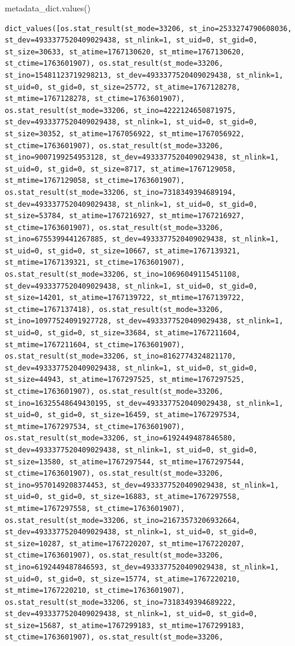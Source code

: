 \documentclass[
  spanish,
  letterpaper,
]{scrbook}
\newenvironment{Shaded}{\begin{snugshade}}{\end{snugshade}}
\newcommand{\NormalTok}[1]{\textcolor[rgb]{0.00,0.23,0.31}{#1}}
\theoremstyle{definition}
\theoremstyle{remark}
\begin{document}
\begin{Shaded}
\begin{Highlighting}[]
\NormalTok{metadata\_dict.values()}
\end{Highlighting}
\end{Shaded}

\begin{verbatim}
dict_values([os.stat_result(st_mode=33206, st_ino=2533274790608036, st_dev=4933377520409029438, st_nlink=1, st_uid=0, st_gid=0, st_size=30633, st_atime=1767130620, st_mtime=1767130620, st_ctime=1763601907), os.stat_result(st_mode=33206, st_ino=15481123719298213, st_dev=4933377520409029438, st_nlink=1, st_uid=0, st_gid=0, st_size=25772, st_atime=1767128278, st_mtime=1767128278, st_ctime=1763601907), os.stat_result(st_mode=33206, st_ino=4222124650871975, st_dev=4933377520409029438, st_nlink=1, st_uid=0, st_gid=0, st_size=30352, st_atime=1767056922, st_mtime=1767056922, st_ctime=1763601907), os.stat_result(st_mode=33206, st_ino=9007199254953128, st_dev=4933377520409029438, st_nlink=1, st_uid=0, st_gid=0, st_size=8717, st_atime=1767129058, st_mtime=1767129058, st_ctime=1763601907), os.stat_result(st_mode=33206, st_ino=7318349394689194, st_dev=4933377520409029438, st_nlink=1, st_uid=0, st_gid=0, st_size=53784, st_atime=1767216927, st_mtime=1767216927, st_ctime=1763601907), os.stat_result(st_mode=33206, st_ino=6755399441267885, st_dev=4933377520409029438, st_nlink=1, st_uid=0, st_gid=0, st_size=10667, st_atime=1767139321, st_mtime=1767139321, st_ctime=1763601907), os.stat_result(st_mode=33206, st_ino=10696049115451108, st_dev=4933377520409029438, st_nlink=1, st_uid=0, st_gid=0, st_size=14201, st_atime=1767139722, st_mtime=1767139722, st_ctime=1767137418), os.stat_result(st_mode=33206, st_ino=10977524091927728, st_dev=4933377520409029438, st_nlink=1, st_uid=0, st_gid=0, st_size=33684, st_atime=1767211604, st_mtime=1767211604, st_ctime=1763601907), os.stat_result(st_mode=33206, st_ino=8162774324821170, st_dev=4933377520409029438, st_nlink=1, st_uid=0, st_gid=0, st_size=44943, st_atime=1767297525, st_mtime=1767297525, st_ctime=1763601907), os.stat_result(st_mode=33206, st_ino=16325548649430195, st_dev=4933377520409029438, st_nlink=1, st_uid=0, st_gid=0, st_size=16459, st_atime=1767297534, st_mtime=1767297534, st_ctime=1763601907), os.stat_result(st_mode=33206, st_ino=6192449487846580, st_dev=4933377520409029438, st_nlink=1, st_uid=0, st_gid=0, st_size=13580, st_atime=1767297544, st_mtime=1767297544, st_ctime=1763601907), os.stat_result(st_mode=33206, st_ino=9570149208374453, st_dev=4933377520409029438, st_nlink=1, st_uid=0, st_gid=0, st_size=16883, st_atime=1767297558, st_mtime=1767297558, st_ctime=1763601907), os.stat_result(st_mode=33206, st_ino=21673573206932664, st_dev=4933377520409029438, st_nlink=1, st_uid=0, st_gid=0, st_size=10287, st_atime=1767220207, st_mtime=1767220207, st_ctime=1763601907), os.stat_result(st_mode=33206, st_ino=6192449487846593, st_dev=4933377520409029438, st_nlink=1, st_uid=0, st_gid=0, st_size=15774, st_atime=1767220210, st_mtime=1767220210, st_ctime=1763601907), os.stat_result(st_mode=33206, st_ino=7318349394689222, st_dev=4933377520409029438, st_nlink=1, st_uid=0, st_gid=0, st_size=15687, st_atime=1767299183, st_mtime=1767299183, st_ctime=1763601907), os.stat_result(st_mode=33206, 
\end{verbatim}
\end{document}
